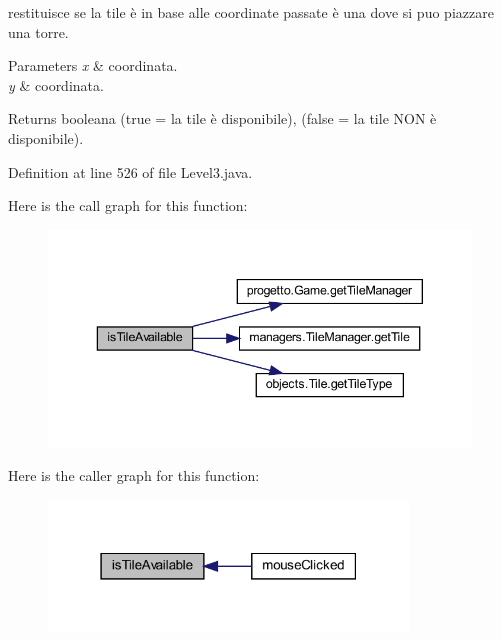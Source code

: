 restituisce se la tile è in base alle coordinate passate è una dove si puo piazzare una torre. 


\begin{DoxyParams}{Parameters}
{\em x} & coordinata. \\
\hline
{\em y} & coordinata.\\
\hline
\end{DoxyParams}
\begin{DoxyReturn}{Returns}
booleana (true = la tile è disponibile), (false = la tile N\+ON è disponibile). 
\end{DoxyReturn}


Definition at line 526 of file Level3.\+java.

Here is the call graph for this function\+:
\nopagebreak
\begin{figure}[H]
\begin{center}
\leavevmode
\includegraphics[width=343pt]{classscenes_1_1_level3_aaeac2ee6b3a920a21928ee7b3dc8e7a9_cgraph}
\end{center}
\end{figure}
Here is the caller graph for this function\+:\nopagebreak
\begin{figure}[H]
\begin{center}
\leavevmode
\includegraphics[width=271pt]{classscenes_1_1_level3_aaeac2ee6b3a920a21928ee7b3dc8e7a9_icgraph}
\end{center}
\end{figure}
\mbox{\label{classscenes_1_1_level3_ab68417e6738c05037923f5f0f21eb586}} 
